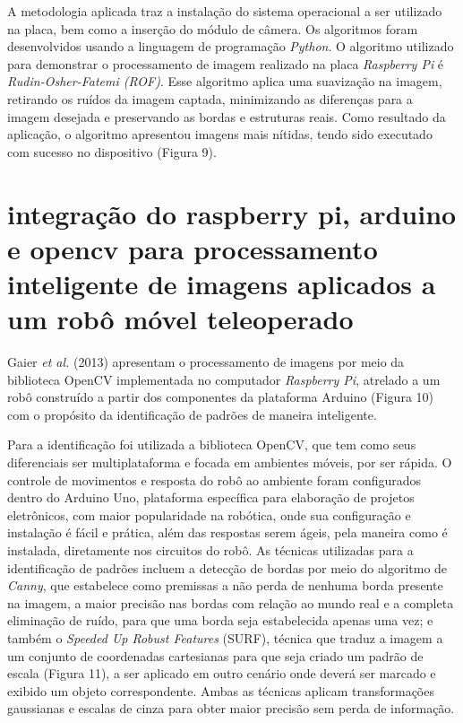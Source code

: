 \documentclass[12pt,oneside,a4paper,chapter=TITLE,section=TITLE,sumario=tradicional]{abntex2}
\begin{document}
A metodologia aplicada traz a instalação do sistema operacional a ser utilizado na placa, bem como a inserção do módulo de câmera. Os algoritmos foram desenvolvidos usando a linguagem de programação \textit{Python}. O algoritmo utilizado para demonstrar o processamento de imagem realizado na placa \textit{Raspberry Pi} é \textit{Rudin-Osher-Fatemi (ROF)}. Esse algoritmo aplica uma suavização na imagem, retirando os ruídos da imagem captada, minimizando as diferenças para a imagem desejada e preservando as bordas e estruturas reais. Como resultado da aplicação, o algoritmo apresentou imagens mais nítidas, tendo sido executado com sucesso no dispositivo (Figura 9).

\begin{figure}[htb]
\end{figure}


\section{integração do raspberry pi, arduino e opencv para processamento inteligente de imagens aplicados a um robô móvel teleoperado}
Gaier \textit{et al.} (2013) apresentam o processamento de imagens por meio da biblioteca OpenCV implementada no computador \textit{Raspberry Pi}, atrelado a um robô construído a partir dos componentes da plataforma Arduino (Figura 10) com o propósito da identificação de padrões de maneira inteligente.

\begin{figure}[htb]
\end{figure}

Para a identificação foi utilizada a biblioteca OpenCV, que tem como seus diferenciais ser multiplataforma e focada em ambientes móveis, por ser rápida. O controle de movimentos e resposta do robô ao ambiente foram configurados dentro do Arduino Uno, plataforma específica para elaboração de projetos eletrônicos, com maior popularidade na robótica, onde sua configuração e instalação é fácil e prática, além das respostas serem ágeis, pela maneira como é instalada, diretamente nos circuitos do robô.
As técnicas utilizadas para a identificação de padrões incluem a detecção de bordas por meio do algoritmo de \textit{Canny}, que estabelece como premissas a não perda de nenhuma borda presente na imagem, a maior precisão nas bordas com relação ao mundo real e a completa eliminação de ruído, para que uma borda seja estabelecida apenas uma vez; e também o \textit{Speeded Up Robust Features} (SURF), técnica que traduz a imagem a um conjunto de coordenadas cartesianas para que seja criado um padrão de escala (Figura 11), a ser aplicado em outro cenário onde deverá ser marcado e exibido um objeto correspondente. Ambas as técnicas aplicam transformações gaussianas e escalas de cinza para obter maior precisão sem perda de informação.
\end{document}
